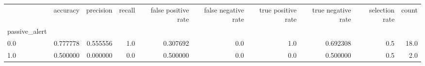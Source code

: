 \begin{tabular}{lrrrrrrrrr}
\toprule
{} &  accuracy &  precision &  recall &  false positive rate &  false negative rate &  true positive rate &  true negative rate &  selection rate &  count \\
passive\_alert &           &            &         &                      &                      &                     &                     &                 &        \\
\midrule
0.0           &  0.777778 &   0.555556 &     1.0 &             0.307692 &                  0.0 &                 1.0 &            0.692308 &             0.5 &   18.0 \\
1.0           &  0.500000 &   0.000000 &     0.0 &             0.500000 &                  0.0 &                 0.0 &            0.500000 &             0.5 &    2.0 \\
\bottomrule
\end{tabular}

